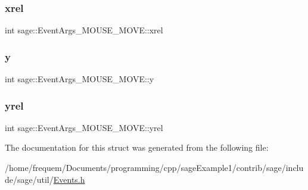 \subsubsection{\texorpdfstring{xrel}{xrel}}
{\footnotesize\ttfamily int sage\+::\+Event\+Args\+\_\+\+M\+O\+U\+S\+E\+\_\+\+M\+O\+V\+E\+::xrel}

\mbox{\label{structsage_1_1EventArgs__MOUSE__MOVE_abea482fa146b91765db17e67a3825a20}} 
\subsubsection{\texorpdfstring{y}{y}}
{\footnotesize\ttfamily int sage\+::\+Event\+Args\+\_\+\+M\+O\+U\+S\+E\+\_\+\+M\+O\+V\+E\+::y}

\mbox{\label{structsage_1_1EventArgs__MOUSE__MOVE_ae9d149bdf92eef7a79114298b3d5c91b}} 
\subsubsection{\texorpdfstring{yrel}{yrel}}
{\footnotesize\ttfamily int sage\+::\+Event\+Args\+\_\+\+M\+O\+U\+S\+E\+\_\+\+M\+O\+V\+E\+::yrel}



The documentation for this struct was generated from the following file\+:\begin{DoxyCompactItemize}
\item 
/home/frequem/\+Documents/programming/cpp/sage\+Example1/contrib/sage/include/sage/util/\mbox{\hyperlink{Events_8h}{Events.\+h}}\end{DoxyCompactItemize}
